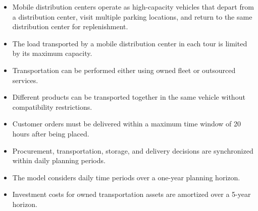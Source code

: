 \documentclass[12pt]{article}
\begin{document}
\begin{itemize}
    \item Mobile distribution centers operate as high-capacity vehicles that depart from a distribution center, visit multiple parking locations, and return to the same distribution center for replenishment.

    \item The load transported by a mobile distribution center in each tour is limited by its maximum capacity.

    \item Transportation can be performed either using owned fleet or outsourced services.

    \item Different products can be transported together in the same vehicle without compatibility restrictions.

    \item Customer orders must be delivered within a maximum time window of 20 hours after being placed.

    \item Procurement, transportation, storage, and delivery decisions are synchronized within daily planning periods.

    \item The model considers daily time periods over a one-year planning horizon.

    \item Investment costs for owned transportation assets are amortized over a 5-year horizon.
\end{itemize}
\newpage
\end{document}

